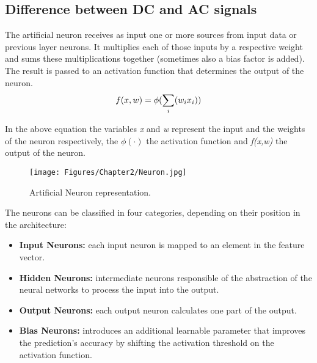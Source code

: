 \subsection{Difference between DC and AC signals}
The artificial neuron receives as input one or more sources from input data or previous layer neurons. It multiplies each of those inputs by a respective weight and sums these multiplications together (sometimes also a bias factor is added). The result is passed to an activation function that determines the output of the neuron.\\
\begin{equation}
    f(x,w) = \phi(\sum_i(w_i\*x_i))
\end{equation}

In the above equation the variables \textit{x} and \textit{w} represent the input and the weights of the neuron respectively, the \(\phi(\cdot)\) the activation function and \textit{f(x,w)} the output of the neuron.

\begin{figure}[th]
    \centering
    \texttt{[image: Figures/Chapter2/Neuron.jpg]}
    \caption[Neuron]{Artificial Neuron representation.}
    \label{fig:Neuron}
\end{figure}

The neurons can be classified in four categories, depending on their position in the architecture:
\begin{itemize}
    \item\textbf{Input Neurons:} each input neuron is mapped to an element in the feature vector.
    \item\textbf{Hidden Neurons:} intermediate neurons responsible of the abstraction of the neural networks to process the input into the output.
    \item\textbf{Output Neurons:} each output neuron calculates one part of the output.
    \item\textbf{Bias Neurons:} introduces an additional learnable parameter that improves the prediction's accuracy by shifting the activation threshold on the activation function.
\end{itemize}

